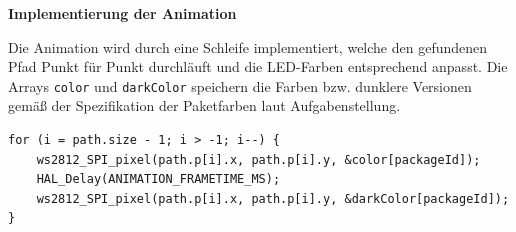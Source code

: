 \noindent \textbf{Implementierung der Animation}

Die Animation wird durch eine Schleife implementiert, welche den gefundenen Pfad Punkt für Punkt durchläuft und die LED-Farben entsprechend anpasst. Die Arrays \texttt{color} und \texttt{darkColor} speichern die Farben bzw. dunklere Versionen gemäß der Spezifikation der Paketfarben laut Aufgabenstellung.

\begin{lstlisting}[style=CStyle]
for (i = path.size - 1; i > -1; i--) {
    ws2812_SPI_pixel(path.p[i].x, path.p[i].y, &color[packageId]);
    HAL_Delay(ANIMATION_FRAMETIME_MS);
    ws2812_SPI_pixel(path.p[i].x, path.p[i].y, &darkColor[packageId]);
}
\end{lstlisting}
